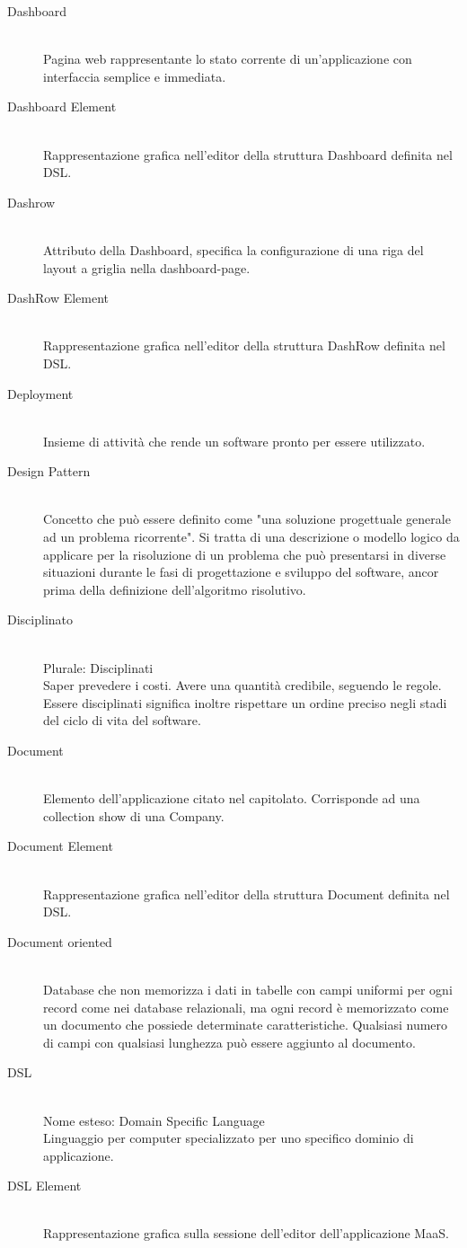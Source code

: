 \begin{description}\item[Dashboard] \hfill \\
Pagina web rappresentante lo stato corrente di
		un'applicazione con interfaccia semplice e immediata.
 \item[Dashboard Element] \hfill \\
Rappresentazione grafica nell'editor della struttura Dashboard definita nel DSL.
 \item[Dashrow] \hfill \\
Attributo della Dashboard, specifica la configurazione di una riga del layout a griglia nella dashboard-page.
 \item[DashRow Element] \hfill \\
Rappresentazione grafica nell'editor della struttura DashRow definita nel DSL.
 \item[Deployment] \hfill \\
Insieme di attività che rende un software pronto per essere utilizzato.
 \item[Design Pattern] \hfill \\
Concetto che può essere definito come "una soluzione progettuale generale ad un problema ricorrente". Si tratta di una descrizione o modello logico da applicare per la risoluzione di un problema che può presentarsi in diverse situazioni durante le fasi di progettazione e sviluppo del software, ancor prima della definizione dell'algoritmo risolutivo.
 \item[Disciplinato] \hfill \\
Plurale: Disciplinati\\ 
Saper prevedere i costi. Avere una quantità credibile, seguendo le regole. Essere disciplinati significa inoltre rispettare un ordine preciso negli stadi del ciclo di vita del software.
 \item[Document] \hfill \\
Elemento dell'applicazione citato nel capitolato. Corrisponde ad una collection show di una Company.
 \item[Document Element] \hfill \\
Rappresentazione grafica nell'editor della struttura Document definita nel DSL.
 \item[Document oriented] \hfill \\
Database che non memorizza i dati in tabelle con campi uniformi per ogni record come nei database relazionali, ma ogni record è memorizzato come un documento che possiede determinate caratteristiche. Qualsiasi numero di campi con qualsiasi lunghezza può essere aggiunto al documento.
 \item[DSL] \hfill \\
Nome esteso: Domain Specific Language\\ 
Linguaggio per computer specializzato per uno specifico dominio di applicazione.
 \item[DSL Element] \hfill \\
Rappresentazione grafica sulla sessione dell'editor dell'applicazione MaaS.
 \end{description}
